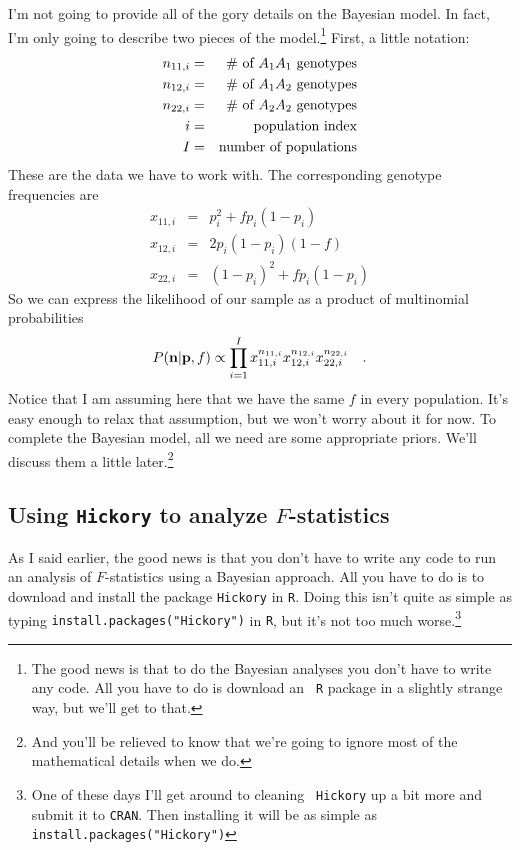 \documentclass[12pt]{article}
\begin{document}
I'm not going to provide all of the gory details on the Bayesian
model. In fact, I'm only going to describe two pieces of the
model.\footnote{The good news is that to do the Bayesian analyses you
  don't have to write any code. All you have to do is download an {\tt
    R} package in a slightly strange way, but we'll get to that.}
First, a little notation:
\begin{eqnarray*}
n_{11,i} &=& \hbox{\# of $A_1A_1$ genotypes} \\
n_{12,i} &=& \hbox{\# of $A_1A_2$ genotypes} \\
n_{22,i} &=& \hbox{\# of $A_2A_2$ genotypes} \\
i         &=& \hbox{population index} \\
I         &=& \hbox{number of populations} \\
\end{eqnarray*}
These are the data we have to work with. The corresponding genotype
frequencies are
\begin{eqnarray*}
x_{11,i} &=& p_{i}^2 + fp_{i}(1-p_{i}) \\
x_{12,i} &=& 2p_{i}(1-p_{i})(1-f) \\
x_{22,i} &=& (1-p_{i})^2 + fp_{i}(1-p_{i})
\end{eqnarray*}
So we can express the likelihood of our sample as a product of
multinomial probabilities
\[
P({\bf n}|{\bf p},f) \propto \prod_{i=1}^I x_{11,i}^{n_{11,i}}
x_{12,i}^{n_{12,i}} x_{22,i}^{n_{22,i}} \quad .
\]
Notice that I am assuming here that we have the same $f$ in every
population. It's easy enough to relax that assumption, but we won't
worry about it for now. To complete the Bayesian model, all we need
are some appropriate priors. We'll discuss them a little
later.\footnote{And you'll be relieved to know that we're going to
  ignore most of the mathematical details when we do.}

\subsection*{Using {\tt Hickory} to analyze $F$-statistics}

As I said earlier, the good news is that you don't have to write any
code to run an analysis of $F$-statistics using a Bayesian
approach. All you have to do is to download and install the package
{\tt Hickory} in {\tt R}. Doing this isn't quite as simple as typing
{\tt install.packages("Hickory")} in {\tt R}, but it's not too much
worse.\footnote{One of these days I'll get around to cleaning {\tt
    Hickory} up a bit more and submit it to {\tt CRAN}. Then
  installing it will be as simple as {\tt
    install.packages("Hickory")}} 
\end{document}
